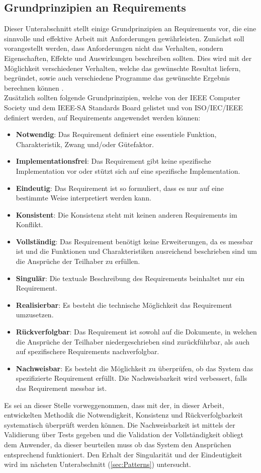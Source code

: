 \subsection{Grundprinzipien an Requirements}
\label{subsec:PrincReq}
Dieser Unterabschnitt stellt einige Grundprinzipien an Requirements vor, die eine sinnvolle und effektive Arbeit mit Anforderungen gewährleisten.
Zunächst soll vorangestellt werden, dass Anforderungen nicht das Verhalten, sondern Eigenschaften, Effekte und Auswirkungen beschreiben sollten. Dies wird mit der Möglichkeit verschiedener Verhalten, welche das gewünschte Resultat liefern, begründet, sowie auch verschiedene Programme das gewünschte Ergebnis berechnen können \cite{Jac17}.\\
Zusätzlich sollten folgende Grundprinzipien, welche von der IEEE Computer Society und dem IEEE-SA Standards Board gelistet \cite{II98} und von ISO/IEC/IEEE \cite{III11} definiert werden, auf Requirements angewendet werden können:
\begin{itemize}
	\item[] \textbf{Notwendig}: Das Requirement definiert eine essentiele Funktion, Charakteristik, Zwang und/oder Gütefaktor.
	\item[] \textbf{Implementationsfrei}: Das Requirement gibt keine spezifische Implementation vor oder stützt sich auf eine spezifische Implementation.
	\item[] \textbf{Eindeutig}: Das Requirement ist so formuliert, dass es nur auf eine bestimmte Weise interpretiert werden kann.
	\item[] \textbf{Konsistent}: Die Konsistenz steht mit keinen anderen Requirements im Konflikt.
	\item[] \textbf{Vollständig}: Das Requirement benötigt keine Erweiterungen, da es messbar ist und die Funktionen und Charakteristiken ausreichend beschrieben sind um die Ansprüche der Teilhaber zu erfüllen.
	\item[] \textbf{Singulär}: Die textuale Beschreibung des Requirements beinhaltet nur ein Requirement.
	\item[] \textbf{Realisierbar}: Es besteht die technische Möglichkeit das Requirement umzusetzen.
	\item[] \textbf{Rückverfolgbar}: Das Requirement ist sowohl auf die Dokumente, in welchen die Ansprüche der Teilhaber niedergeschrieben sind zurückführbar, als auch auf spezifischere Requirements nachverfolgbar.
	\item[] \textbf{Nachweisbar}: Es besteht die Möglichkeit zu überprüfen, ob das System das spezifizierte Requirement erfüllt. Die Nachweisbarkeit wird verbessert, falls das Requirement messbar ist.
\end{itemize}
Es sei an dieser Stelle vorweggenommen, dass mit der, in dieser Arbeit, entwickelten Methodik die Notwendigkeit, Konsistenz und Rückverfolgbarkeit systematisch überprüft werden können. Die Nachweisbarkeit ist mittels der Validierung über Tests gegeben und die Validation der Vollständigkeit obliegt dem Anwender, da dieser beurteilen muss ob das System den Ansprüchen entsprechend funktioniert. Den Erhalt der Singularität und der Eindeutigkeit wird im nächsten Unterabschnitt (\ref{sec:Patterns}) untersucht.

